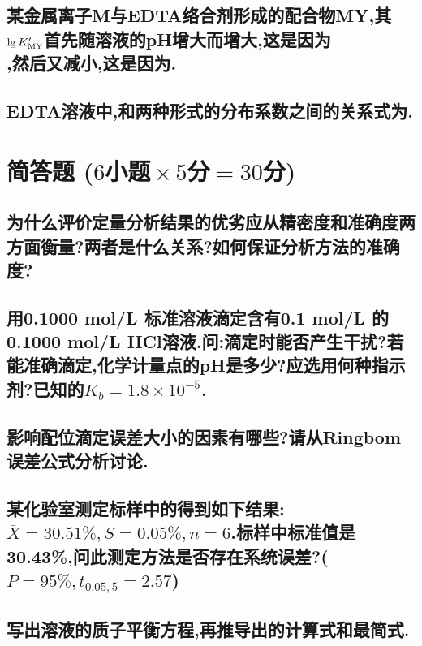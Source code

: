 \documentclass[UTF8]{article}
\newcommand{\ptsMulti}[3]{ \small($#1\!\!$小题$\!\!\times #2\!\!$分$\!\!=\!\!#3\!\!$分)}
\begin{document}
    \subsection{某金属离子M与EDTA络合剂形成的配合物MY,其$\lg K'_{\ce{MY}}$首先随溶液的pH增大而增大,这是因为\\ \underline{\hspace{5cm}},然后又减小,这是因为\underline{\hspace{5cm}}.}
        
    \subsection{EDTA溶液中,和两种形式的分布系数之间的关系式为\underline{\hspace{5cm}}.}
    
    \section{简答题\ptsMulti{6}{5}{30}}

    \subsection{为什么评价定量分析结果的优劣应从精密度和准确度两方面衡量?两者是什么关系?如何保证分析方法的准确度?}
    
    \subsection{用0.1000 mol/L 标准溶液滴定含有0.1 mol/L 的0.1000 mol/L HCl溶液.问:滴定时能否产生干扰?若能准确滴定,化学计量点的pH是多少?应选用何种指示剂?已知的$K_{b}=1.8\times 10^{-5}$.}
    
    \subsection{影响配位滴定误差大小的因素有哪些?请从Ringbom误差公式分析讨论.}
    
    \subsection{某化验室测定标样中的得到如下结果:$\overline{X}=30.51\%,S=0.05\%,n=6$.标样中标准值是30.43\%,问此测定方法是否存在系统误差?($P=95\%,t_{0.05,5}=2.57$)}
    
    \subsection{写出溶液的质子平衡方程,再推导出\ce{[H+]}的计算式和最简式.}
    
\end{document}
